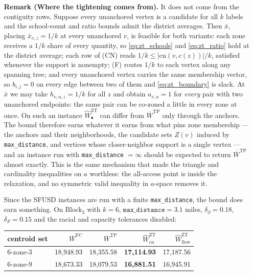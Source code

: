 \documentclass{article}
\begin{document}
\noindent\textbf{Remark (Where the tightening comes from).}
It does not come from the contiguity rows. Suppose every unanchored vertex is a candidate for all $k$ labels and the school-count and ratio bounds admit the district averages. Then $\bar{x}$, placing $\bar{x}_{v,z} = 1/k$ at every unanchored $v$, is feasible for both variants: each zone receives a $1/k$ share of every quantity, so \eqref{eq:zt_schools} and \eqref{eq:zt_ratio} hold at the district average; each row of (CN) reads $1/k \leq |\text{cn}(v, c(z))|/k$, satisfied whenever the support is nonempty; (F) routes $1/k$ to each vertex along any spanning tree; and every unanchored vertex carries the same membership vector, so $b_{i,j} = 0$ on every edge between two of them and \eqref{eq:zt_boundary} is slack. At $\bar{x}$ we may take $h_{v,u,z} = 1/k$ for all $z$ and obtain $a_{v,u} = 1$ for \emph{every} pair with two unanchored endpoints: the same pair can be co-zoned a little in every zone at once. On such an instance $\widehat{W}^{\mathrm{ZT}}_\bullet$ can differ from $\overline{W}^{\mathrm{TP}}$ only through the anchors. The bound therefore earns whatever it earns from what pins zone membership --- the anchors and their neighborhoods, the candidate sets $Z(v)$ induced by \texttt{max\_distance}, and vertices whose closer-neighbor support is a single vertex --- and an instance run with \texttt{max\_distance} $= \infty$ should be expected to return $\overline{W}^{\mathrm{TP}}$ almost exactly. This is the same mechanism that made the triangle and cardinality inequalities on $a$ worthless: the all-access point is inside the relaxation, and no symmetric valid inequality in $a$-space removes it.

Since the SFUSD instances are run with a finite \texttt{max\_distance}, the bound does earn something. On $\text{Block}_2$ with $k = 6$, $\texttt{max\_distance} = 3.1$ miles, $\delta_\partial = 0.18$, $\delta_F = 0.15$ and the racial and capacity tolerances disabled:

\begin{center}
\begin{tabular}{lrrrr}
\hline
centroid set & $\overline{W}^{\mathrm{FC}}$ & $\overline{W}^{\mathrm{TP}}$ & $\widehat{W}^{\mathrm{ZT}}_{\mathrm{cn}}$ & $\widehat{W}^{\mathrm{ZT}}_{\mathrm{flow}}$ \\
\hline
6-zone-3 & 18{,}948.93 & 18{,}355.58 & \textbf{17{,}114.93} & 17{,}187.56 \\
6-zone-9 & 18{,}673.33 & 18{,}079.53 & \textbf{16{,}881.51} & 16{,}945.91 \\
\hline
\end{tabular}
\end{center}
\end{document}
